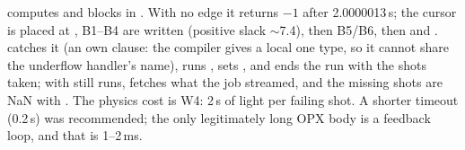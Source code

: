  computes  and blocks in . With no
edge it returns $-1$ after 2.0000013\,s; the cursor is placed at
, B1--B4 are written (positive slack $\sim$7.4\us),
then B5/B6, then  and . 
catches it (an own  clause: the compiler gives a local one type,
so it cannot share the underflow handler's name), runs
, sets , and ends the run with
the shots taken; with   still
runs,  fetches what the job streamed, and the missing shots are
NaN with . The physics cost is W4: 2\,s of light per
failing shot. A shorter timeout (0.2\,s) was recommended; the only legitimately
long OPX body is a feedback loop, and that is 1--2\,ms.
